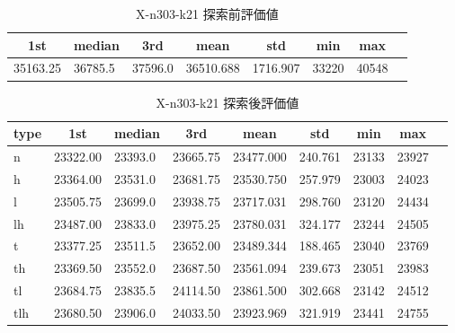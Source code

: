 \begin{table}[htbp]
    \centering
    \caption{X-n303-k21 探索前評価値}
    \begin{tabular}{|l|l|l|l|l|l|l|l|}\hline
    \multicolumn{1}{|c|}{\textbf{1st}}
    &\multicolumn{1}{c|}{\textbf{median}}
    &\multicolumn{1}{c|}{\textbf{3rd}}
    &\multicolumn{1}{c|}{\textbf{mean}}
    &\multicolumn{1}{c|}{\textbf{std}}
    &\multicolumn{1}{c|}{\textbf{min}}
    &\multicolumn{1}{c|}{\textbf{max}}\\\hline
	35163.25 & 36785.5 & 37596.0 & 36510.688 & 1716.907 & 33220 & 40548\\\hline
	\end{tabular}
\end{table}
\begin{table}[htbp]
    \centering
    \caption{X-n303-k21 探索後評価値}
    \begin{tabular}{|l|l|l|l|l|l|l|l|l|}\hline
    \multicolumn{1}{|c|}{\textbf{type}}
    &\multicolumn{1}{|c|}{\textbf{1st}}
    &\multicolumn{1}{c|}{\textbf{median}}
    &\multicolumn{1}{c|}{\textbf{3rd}}
    &\multicolumn{1}{c|}{\textbf{mean}}
    &\multicolumn{1}{c|}{\textbf{std}}
    &\multicolumn{1}{c|}{\textbf{min}}
    &\multicolumn{1}{c|}{\textbf{max}}\\\hline
	n & 23322.00 & 23393.0 & 23665.75 & 23477.000 & 240.761 & 23133 & 23927\\\hline
	h & 23364.00 & 23531.0 & 23681.75 & 23530.750 & 257.979 & 23003 & 24023\\\hline
	l & 23505.75 & 23699.0 & 23938.75 & 23717.031 & 298.760 & 23120 & 24434\\\hline
	lh & 23487.00 & 23833.0 & 23975.25 & 23780.031 & 324.177 & 23244 & 24505\\\hline
	t & 23377.25 & 23511.5 & 23652.00 & 23489.344 & 188.465 & 23040 & 23769\\\hline
	th & 23369.50 & 23552.0 & 23687.50 & 23561.094 & 239.673 & 23051 & 23983\\\hline
	tl & 23684.75 & 23835.5 & 24114.50 & 23861.500 & 302.668 & 23142 & 24512\\\hline
	tlh & 23680.50 & 23906.0 & 24033.50 & 23923.969 & 321.919 & 23441 & 24755\\\hline
	\end{tabular}
\end{table}
